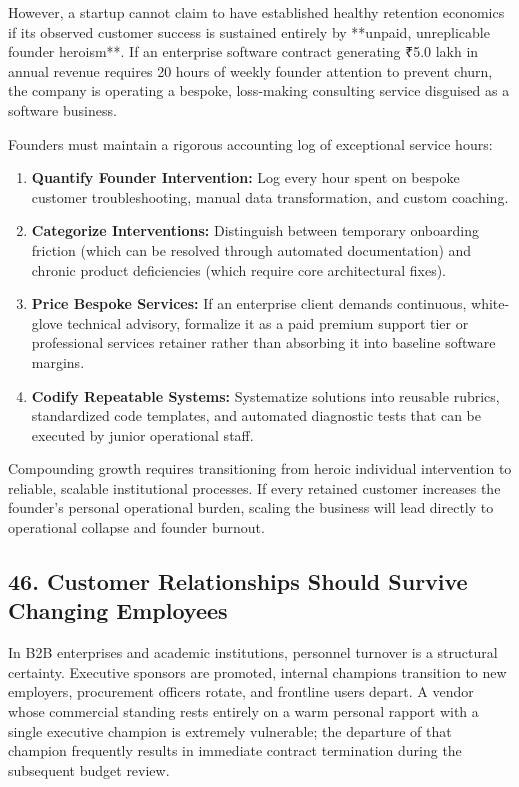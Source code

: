 However, a startup cannot claim to have established healthy retention economics if its observed customer success is sustained entirely by **unpaid, unreplicable founder heroism**. If an enterprise software contract generating ₹5.0 lakh in annual revenue requires 20 hours of weekly founder attention to prevent churn, the company is operating a bespoke, loss-making consulting service disguised as a software business.

Founders must maintain a rigorous accounting log of exceptional service hours:
\begin{enumerate}[leftmargin=*]
\item \textbf{Quantify Founder Intervention:} Log every hour spent on bespoke customer troubleshooting, manual data transformation, and custom coaching.
\item \textbf{Categorize Interventions:} Distinguish between temporary onboarding friction (which can be resolved through automated documentation) and chronic product deficiencies (which require core architectural fixes).
\item \textbf{Price Bespoke Services:} If an enterprise client demands continuous, white-glove technical advisory, formalize it as a paid premium support tier or professional services retainer rather than absorbing it into baseline software margins.
\item \textbf{Codify Repeatable Systems:} Systematize solutions into reusable rubrics, standardized code templates, and automated diagnostic tests that can be executed by junior operational staff.
\end{enumerate}

Compounding growth requires transitioning from heroic individual intervention to reliable, scalable institutional processes. If every retained customer increases the founder's personal operational burden, scaling the business will lead directly to operational collapse and founder burnout.

\subsection*{46. Customer Relationships Should Survive Changing Employees}

In B2B enterprises and academic institutions, personnel turnover is a structural certainty. Executive sponsors are promoted, internal champions transition to new employers, procurement officers rotate, and frontline users depart. A vendor whose commercial standing rests entirely on a warm personal rapport with a single executive champion is extremely vulnerable; the departure of that champion frequently results in immediate contract termination during the subsequent budget review.

